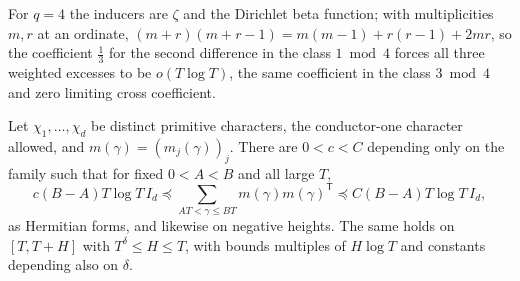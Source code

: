 For $q=4$ the inducers are $\zeta$ and the Dirichlet beta function; with multiplicities $m,r$ at an
ordinate, $(m+r)(m+r-1)=m(m-1)+r(r-1)+2mr$, so the coefficient $\tfrac13$ for the second difference in
the class $1\bmod4$ forces all three weighted excesses to be $o(T\log T)$, the same coefficient in the
class $3\bmod4$ and zero limiting cross coefficient.

\begin{theorem}\label{zer:thm:familyrate}
Let $\chi_1,\dots,\chi_d$ be distinct primitive characters, the conductor-one character allowed, and
$m(\gamma)=(m_j(\gamma))_j$. There are $0<c<C$ depending only on the family such that for fixed
$0<A<B$ and all large $T$,
\[
 c(B-A)T\log T\,I_d\preceq\sum_{AT<\gamma\le BT}m(\gamma)m(\gamma)^{\mathsf T}\preceq C(B-A)T\log T\,I_d ,
\]
as Hermitian forms, and likewise on negative heights. The same holds on $[T,T+H]$ with
$T^\delta\le H\le T$, with bounds multiples of $H\log T$ and constants depending also on $\delta$.
\end{theorem}
